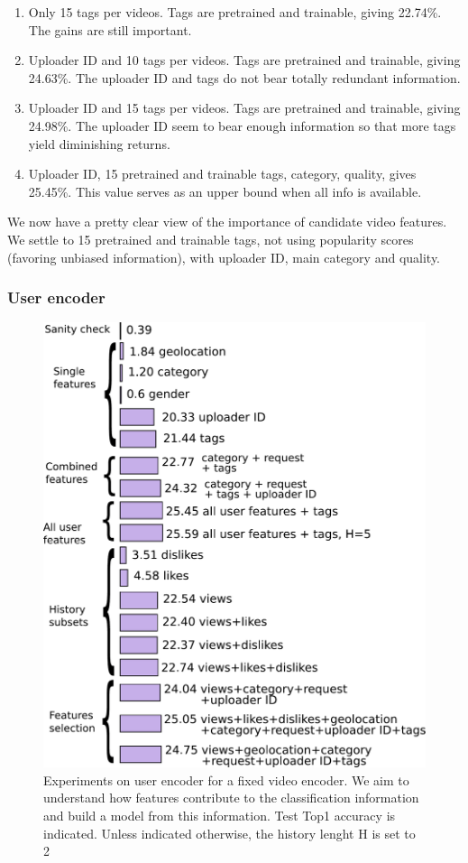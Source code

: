 \begin{enumerate}
    \item Only 15 tags per videos. Tags are pretrained and trainable, giving 22.74\%. The gains are still important.
    \item Uploader ID and 10 tags per videos. Tags are pretrained and trainable, giving 24.63\%. The uploader ID and tags do not bear totally redundant information.
    \item Uploader ID and 15 tags per videos. Tags are pretrained and trainable, giving 24.98\%. The uploader ID seem to bear enough information so that more tags yield diminishing returns.
    \item Uploader ID, 15 pretrained and trainable tags, category, quality, gives 25.45\%. This value serves as an upper bound when all info is available.
\end{enumerate}

We now have a pretty clear view of the importance of candidate video features. We settle to 15 pretrained and trainable tags, not using popularity scores (favoring unbiased information), with uploader ID, main category and quality.

\subsubsection{User encoder}

\begin{figure}
    \centering
    \includegraphics[width=0.6\columnwidth]{70-files/user-encoder-tests.pdf}
    \caption{Experiments on user encoder for a fixed video encoder. We aim to understand how features contribute to the classification information and build a model from this information. Test Top1 accuracy is indicated. Unless indicated otherwise, the history lenght H is set to 2}
    \label{fig:user-enc-exp}
\end{figure}


